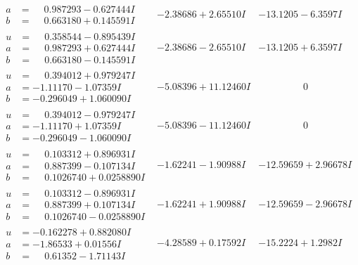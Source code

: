 \documentclass[1p]{elsarticle_modified}
\theoremstyle{definition}
\begin{document}
$$\begin{array}{c|c|c}
\begin{aligned}
a &= \phantom{-}0.987293 - 0.627444 I \\
b &= \phantom{-}0.663180 + 0.145591 I\end{aligned}
 & -2.38686 + 2.65510 I & -13.1205 - 6.3597 I \\ \hline\begin{aligned}
u &= \phantom{-}0.358544 - 0.895439 I \\
a &= \phantom{-}0.987293 + 0.627444 I \\
b &= \phantom{-}0.663180 - 0.145591 I\end{aligned}
 & -2.38686 - 2.65510 I & -13.1205 + 6.3597 I \\ \hline\begin{aligned}
u &= \phantom{-}0.394012 + 0.979247 I \\
a &= -1.11170 - 1.07359 I \\
b &= -0.296049 + 1.060090 I\end{aligned}
 & -5.08396 + 11.12460 I & \phantom{-0.000000 } 0 \\ \hline\begin{aligned}
u &= \phantom{-}0.394012 - 0.979247 I \\
a &= -1.11170 + 1.07359 I \\
b &= -0.296049 - 1.060090 I\end{aligned}
 & -5.08396 - 11.12460 I & \phantom{-0.000000 } 0 \\ \hline\begin{aligned}
u &= \phantom{-}0.103312 + 0.896931 I \\
a &= \phantom{-}0.887399 - 0.107134 I \\
b &= \phantom{-}0.1026740 + 0.0258890 I\end{aligned}
 & -1.62241 - 1.90988 I & -12.59659 + 2.96678 I \\ \hline\begin{aligned}
u &= \phantom{-}0.103312 - 0.896931 I \\
a &= \phantom{-}0.887399 + 0.107134 I \\
b &= \phantom{-}0.1026740 - 0.0258890 I\end{aligned}
 & -1.62241 + 1.90988 I & -12.59659 - 2.96678 I \\ \hline\begin{aligned}
u &= -0.162278 + 0.882080 I \\
a &= -1.86533 + 0.01556 I \\
b &= \phantom{-}0.61352 - 1.71143 I\end{aligned}
 & -4.28589 + 0.17592 I & -15.2224 + 1.2982 I \\ \hline\begin{aligned}

\end{aligned}
\end{array}$$
\end{document}
